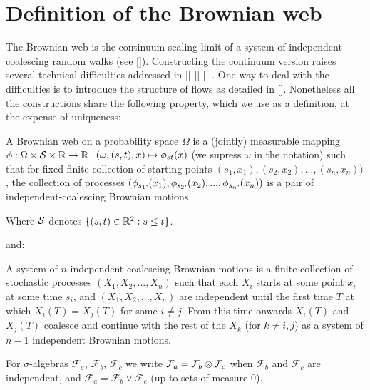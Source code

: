 {
\section{Definition of the Brownian web}

The Brownian web is the continuum scaling limit of a system of
independent coalescing random walks (see []).  Constructing the
continuum version raises several technical difficulties addressed in
[] [] [] . One way to deal with the difficulties is to introduce the
structure of flows as detailed in [].  Nonetheless all the
constructions share the following property, which we use as a
definition, at the expense of uniqueness:

\begin{definition}
  A Brownian web on a probability space $\Omega$ is a (jointly)
  measurable mapping $\phi : \Omega \times \mathcal{S} \times \mathbb{R}
  \to \mathbb{R}$, $(\omega, (s, t), x) \mapsto \phi_{{s}{t}}(x)$ (we supress
  $\omega$ in the notation) such that for fixed finite collection of
  starting points $(s_1, x_1),(s_2, x_2),...,(s_n, x_n))$, the
  collection of processes $(\phi_{{s_1}{\cdot}}(x_1),
  \phi_{{s_2}{\cdot}}(x_2),...,\phi_{{s_n}{\cdot}}(x_n))$ is a pair of
  independent-coalescing Brownian motions.
\end{definition}

\begin{notation}
  Where $\mathcal{S}$ denotes $\{(s, t) \in \mathbb{R}^2 : s \le t\}$.
\end{notation}

and:

\begin{definition}
  \label{def:independent-coalescing-bm}
  \newcommand{\maxsym}{\vee}
  A system of $n$ independent-coalescing Brownian motions is a finite
  collection of stochastic processes $(X_1, X_2,...,X_n)$ such that
  each $X_i$ starts at some point $x_i$ at some time $s_i$, and $(X_1,
  X_2,...,X_n)$ are independent until the first time $T$ at which
  $X_i(T)=X_j(T)$ for some $i\neq j$. From this time onwards $X_i(T)$
  and $X_j(T)$ coalesce and continue with the rest of the $X_k$ (for
  $k\neq i,j$) as a system of $n-1$ independent Brownian motions.
\end{definition}

\begin{notation}
  \newcommand{\F}{\mathcal{F}}

  For $\sigma$-algebras $\F_a$, $\F_b$, $\F_c$ we write $\F_a = \F_b
  \tensor \F_c$ when $\F_b$ and $\F_c$ are independent, and $\F_a =
  \F_b \vee \F_c$ (up to sets of measure $0$).

\end{notation}

}
